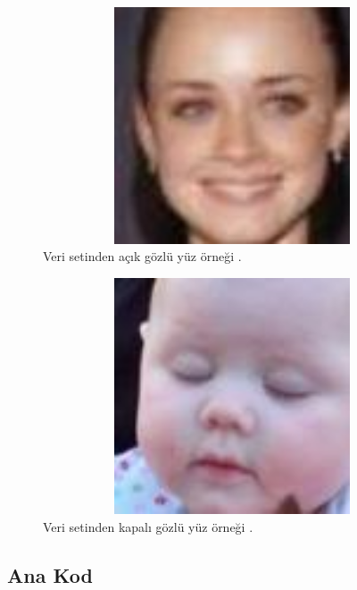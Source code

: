 \documentclass[12pt, a4paper]{article}
\begin{document}
  \begin{figure}[!h]
 	\centering
 	\includegraphics[width=14cm, height=7cm, keepaspectratio]{Alexis_Bledel_0001.jpg}
 	\caption{Veri setinden açık gözlü yüz örneği \cite{mrl}.}
 \end{figure}
  \begin{figure}[!h]
 	\centering
 	\includegraphics[width=17cm, height=7cm, keepaspectratio]{closed_eye_0047.jpg_face_2.jpg}
 	\caption{Veri setinden kapalı gözlü yüz örneği \cite{mrl}.} 
 \end{figure}\par
 	\subsection{Ana Kod}
 	
\end{document}
